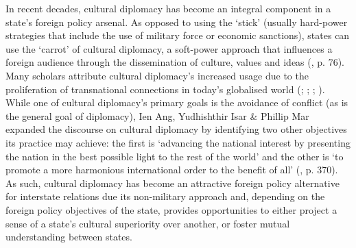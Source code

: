 In recent decades, cultural diplomacy has become an integral component in a state’s foreign policy arsenal. As opposed to using the ‘stick’ (usually hard-power strategies that include the use of military force or economic sanctions), states can use the ‘carrot’ of cultural diplomacy, a soft-power approach that influences a foreign audience through the dissemination of culture, values and ideas (\cite{lenczowski2009}, p. 76). Many scholars attribute cultural diplomacy’s increased usage due to the proliferation of transnational connections in today’s globalised world (\cite{snow2008}; \cite{ang2015}; \cite{chitty2016}; \cite{hartig2016}). While one of cultural diplomacy’s primary goals is the avoidance of conflict (as is the general goal of diplomacy), Ien Ang, Yudhishthir Isar \& Phillip Mar expanded the discourse on cultural diplomacy by identifying two other objectives its practice may achieve:  the first is ‘advancing the national interest by presenting the nation in the best possible light to the rest of the world’ and the other is ‘to promote a more harmonious international order to the benefit of all’ (\citeyear{ang2015}, p. 370). As such, cultural diplomacy has become an attractive foreign policy alternative for interstate relations due its non-military approach and, depending on the foreign policy objectives of the state, provides opportunities to either project a sense of a state’s cultural superiority over another, or foster mutual understanding between states.


